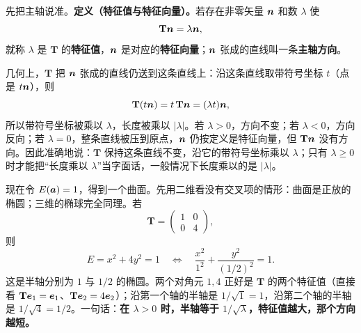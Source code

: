 \documentclass[11pt]{ctexart}
\newcommand{\ten}[1]{\mathbf{#1}}
\let\origsubhdr\subhdr
\renewcommand{\subhdr}[1]{\par\needspace{3\baselineskip}\origsubhdr{#1}}
\begin{document}

先把主轴说准。\textbf{定义（特征值与特征向量）。}若存在非零矢量 $\boldsymbol{n}$ 和数 $\lambda$ 使
\[
\ten T\vect n=\lambda\vect n,
\]
就称 $\lambda$ 是 $\ten T$ 的\textbf{特征值}，$\boldsymbol{n}$ 是对应的\textbf{特征向量}；$\boldsymbol{n}$ 张成的直线叫一条\textbf{主轴方向}。

几何上，$\ten T$ 把 $\boldsymbol{n}$ 张成的直线仍送到这条直线上：沿这条直线取带符号坐标 $t$（点是 $t\boldsymbol{n}$），则
\[
\ten T(t\vect n)=t\,\ten T\vect n=(\lambda t)\vect n,
\]
所以带符号坐标被乘以 $\lambda$，长度被乘以 $|\lambda|$。若 $\lambda>0$，方向不变；若 $\lambda<0$，方向反向；若 $\lambda=0$，整条直线被压到原点，$\boldsymbol{n}$ 仍按定义是特征向量，但 $\ten T\vect n$ 没有方向。因此准确地说：$\ten T$ 保持这条直线不变，沿它的带符号坐标乘以 $\lambda$；只有 $\lambda\ge0$ 时才能把“长度乘以 $\lambda$”当字面话，一般情况下长度乘以的是 $|\lambda|$。

现在令 $E(\boldsymbol{a})=1$，得到一个曲面。先用二维看没有交叉项的情形：曲面是正放的椭圆；三维的椭球完全同理。若
\[
\ten T=\begin{pmatrix}1&0\\0&4\end{pmatrix},
\]
则
\[
E=x^2+4y^2=1
\quad\Longleftrightarrow\quad
\frac{x^2}{1^2}+\frac{y^2}{(1/2)^2}=1 .
\]
这是半轴分别为 $1$ 与 $1/2$ 的椭圆。两个对角元 $1,4$ 正好是 $\ten T$ 的两个特征值（直接看 $\ten T\vect e_1=\vect e_1$、$\ten T\vect e_2=4\vect e_2$）；沿第一个轴的半轴是 $1/\sqrt1=1$，沿第二个轴的半轴是 $1/\sqrt4=1/2$。一句话：\textbf{在 $\lambda>0$ 时，半轴等于 $1/\sqrt{\lambda}$，特征值越大，那个方向越短。}
\end{document}
